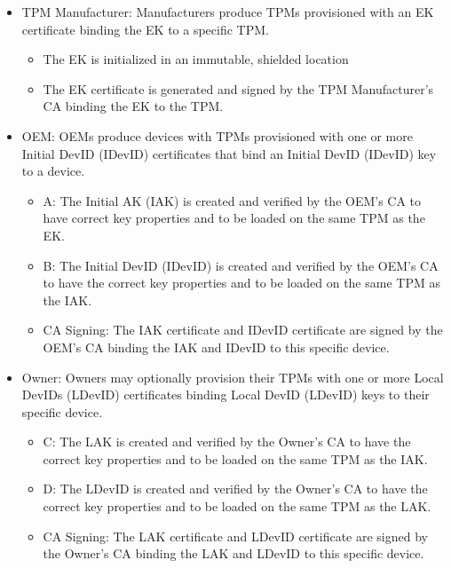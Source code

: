 \documentclass[runningheads]{llncs}
\begin{document}
\begin{itemize}[itemsep=0pt,parsep=0pt,partopsep=0pt]
\item \textsf{TPM Manufacturer}: Manufacturers produce TPMs provisioned with an
  EK certificate binding the EK to a specific TPM.
  \begin{itemize}[itemsep=0pt,parsep=0pt,partopsep=0pt]
  \item The EK is initialized in an immutable, shielded location
  \item The EK certificate is generated and signed by the TPM
    Manufacturer's CA binding the EK to the TPM.
  \end{itemize}
\item \textsf{OEM}: OEMs produce devices with TPMs provisioned with
  one or more Initial DevID (IDevID) certificates that bind an Initial
  DevID (IDevID) key to a device.
  \begin{itemize}[itemsep=0pt,parsep=0pt,partopsep=0pt]
  \item \textsf{A}: The Initial AK (IAK) is created and verified by
    the OEM's CA to have correct key properties and to be loaded on
    the same TPM as the EK.
  \item \textsf{B}: The Initial DevID (IDevID) is created and verified
    by the OEM's CA to have the correct key properties and to be
    loaded on the same TPM as the IAK.
  \item \textsf{CA Signing}: The IAK certificate and IDevID
    certificate are signed by the OEM's CA binding the IAK and IDevID
    to this specific device.
  \end{itemize}
\item \textsf{Owner}: Owners may optionally provision their TPMs with
  one or more Local DevIDs (LDevID) certificates binding Local DevID
  (LDevID) keys to their specific device.
  \begin{itemize}[itemsep=0pt,parsep=0pt,partopsep=0pt]
  \item \textsf{C}: The LAK is created and verified by the Owner's CA
    to have the correct key properties and to be loaded on the same
    TPM as the IAK.
  \item \textsf{D}: The LDevID is created and verified by the Owner's
    CA to have the correct key properties and to be loaded on the same
    TPM as the LAK.
  \item \textsf{CA Signing}: The LAK certificate and LDevID
    certificate are signed by the Owner's CA binding the LAK and
    LDevID to this specific device.
  \end{itemize}
\end{itemize}
\end{document}
